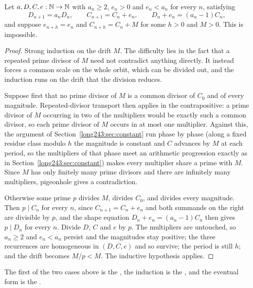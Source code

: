 \documentclass[11pt]{article}
\begin{document}
\begin{theorem}\label{long243:res:periodic}
Let $a,D,C,e:\mathbb{N}\to\mathbb{N}$ with $a_n\ge2$, $e_n>0$ and $e_n<a_n$ for every $n$,
satisfying
\[
 D_{n+1}=a_nD_n,\qquad C_{n+1}=C_n+e_n,\qquad D_n+e_n=(a_n-1)C_n ,
\]
and suppose $e_{n+h}=e_n$ and $C_{n+h}=C_n+M$ for some $h>0$ and $M>0$.  This
is impossible.
\end{theorem}

\begin{proof}
Strong induction on the drift $M$.  The difficulty lies in the fact that a
repeated prime divisor of $M$ need not contradict anything directly.  It
instead forces a common scale on the whole orbit, which can be divided out, and
the induction runs on the drift that the division reduces.

Suppose first that no prime divisor of $M$ is a common divisor of $C_0$ and of
every magnitude.  Repeated-divisor transport then applies in the
contrapositive: a prime divisor of $M$ occurring in two of the multipliers
would be exactly such a common divisor, so each prime divisor of $M$ occurs in
at most one multiplier.  Against this, the argument of
Section~\ref{long243:sec:constant} run phase by phase (along a fixed residue class
modulo $h$ the magnitude is constant and $C$ advances by $M$ at each period, so
the multipliers of that phase meet an arithmetic progression exactly as in
Section~\ref{long243:sec:constant}) makes every multiplier share a prime with $M$.
Since $M$ has only finitely many prime divisors and there are infinitely many
multipliers, pigeonhole gives a contradiction.

Otherwise some prime $p$ divides $M$, divides $C_0$, and divides every
magnitude.  Then $p\mid C_n$ for every $n$, since $C_{n+1}=C_n+e_n$ and both
summands on the right are divisible by $p$, and the shape equation
$D_n+e_n=(a_n-1)C_n$ then gives $p\mid D_n$ for every $n$.  Divide $D$, $C$ and
$e$ by $p$.  The multipliers are untouched, so $a_n\ge2$ and $e_n<a_n$ persist
and the magnitudes stay positive; the three recurrences are homogeneous in
$(D,C,e)$ and so survive; the period is still $h$; and the drift becomes
$M/p<M$.  The inductive hypothesis applies.
\end{proof}

\noindent The first of the two cases above is the
, the induction is the
, and the eventual form is the
.
\end{document}
